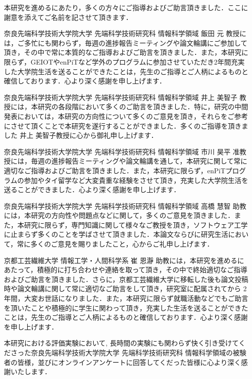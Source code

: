\documentclass[12pt]{jarticle} %
\begin{document}
%
%
\acknowledgements

本研究を進めるにあたり，多くの方々にご指導およびご助言頂きました．ここに謝意を添えてご名前を記させて頂きます．

奈良先端科学技術大学院大学 先端科学技術研究科 情報科学領域 飯田 元 教授には，ご多忙にも関わらず，毎週の進捗報告ミーティングや論文輪講にご参加して頂き，その中で常に本質的なご指導およびご助言を頂きました．また，本研究に限らず，GEIOTやenPiTなど学外のプログラムに参加させていただき2年間充実した大学院生活を送ることができたことは，先生のご指導とご人柄によるものと確信しております．心より深く感謝を申し上げます．

奈良先端科学技術大学院大学 先端科学技術研究科 情報科学領域 井上 美智子 教授には，本研究の各段階において多くのご助言を頂きました．特に，研究の中間発表においては，本研究の方向性について多くのご意見を頂き，それらをご参考にさせて頂くことで本研究を遂行することができました．多くのご指導を頂きました 井上 美智子教授に心から御礼申し上げます．

奈良先端科学技術大学院大学 先端科学技術研究科 情報科学領域 市川 昊平 准教授には，毎週の進捗報告ミーティングや論文輪講を通して，本研究に関して常に適切なご指導およびご助言を頂きました．また，本研究に限らず，enPiTプログラムの参加やタイ留学など大変貴重な経験をさせて頂き，充実した大学院生活を送ることができました．心より深く感謝を申し上げます．

奈良先端科学技術大学院大学 先端科学技術研究科 情報科学領域 高橋 慧智 助教には，本研究の方向性や問題点などに関して，多くのご意見を頂きました．また，本研究に限らず，専門知識に関して様々なご教授を頂き，ソフトウェア工学に止まらず多くのことを学ばさせて頂きました．本論文ならびに研究生活において，常に多くのご意見を賜りましたこと，心からご礼申し上げます．

京都工芸繊維大学 情報工学・人間科学系 崔 恩瀞 助教には，本研究を進めるにあたって，積極的に打ち合わせや連絡を取って頂き，その中で終始適切なご指導およびご助言を頂きました．さらに，京都工芸繊維大学に移転した後も論文投稿時や論文輪講に関して常に適切なご助言をして頂き，研究室に配属されてから 2年間，大変お世話になりました．また，本研究に限らず就職活動などでもご助言を頂いたことや積極的に学生に関わって頂き，充実した生活を送ることができたことは，先生のご指導とご人柄によるものと確信しております．心より深く感謝を申し上げます．

本研究における評価実験において, 長時間の実験にも関わらず快く引き受けてくださった奈良先端科学技術大学院大学 先端科学技術研究科 情報科学領域の被験者の皆様，並びにオンラインアンケートに回答してくだった皆様に心より深く感謝いたします． 
\end{document}
